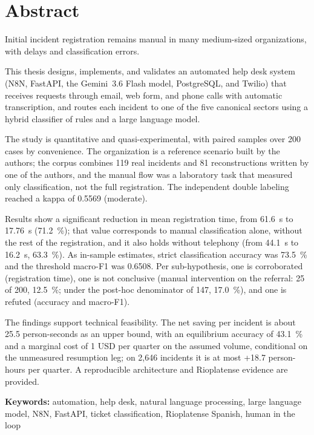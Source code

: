 \newpage
\section*{Abstract}

Initial incident registration remains manual in many medium-sized organizations, with delays and classification errors.

This thesis designs, implements, and validates an automated help desk system (N8N, FastAPI, the Gemini~3.6 Flash model, PostgreSQL, and Twilio) that receives requests through email, web form, and phone calls with automatic transcription, and routes each incident to one of the five canonical sectors using a hybrid classifier of rules and a large language model.

The study is quantitative and quasi-experimental, with paired samples over 200 cases by convenience. The organization is a reference scenario built by the authors; the corpus combines 119 real incidents and 81 reconstructions written by one of the authors, and the manual flow was a laboratory task that measured only classification, not the full registration. The independent double labeling reached a kappa of 0.5569 (moderate).

Results show a significant reduction in mean registration time, from 61.6~s to 17.76~s (71.2~\%); that value corresponds to manual classification alone, without the rest of the registration, and it also holds without telephony (from 44.1~s to 16.2~s, 63.3~\%). As in-sample estimates, strict classification accuracy was 73.5~\% and the threshold macro-F1 was 0.6508. Per sub-hypothesis, one is corroborated (registration time), one is not conclusive (manual intervention on the referral: 25 of 200, 12.5~\%; under the post-hoc denominator of 147, 17.0~\%), and one is refuted (accuracy and macro-F1).

The findings support technical feasibility. The net saving per incident is about 25.5 person-seconds as an upper bound, with an equilibrium accuracy of 43.1~\% and a marginal cost of 1 USD per quarter on the assumed volume, conditional on the unmeasured resumption leg; on 2,646 incidents it is at most +18.7 person-hours per quarter. A reproducible architecture and Rioplatense evidence are provided.

\bigskip
\noindent\textbf{Keywords:} automation, help desk, natural language processing, large language model, N8N, FastAPI, ticket classification, Rioplatense Spanish, human in the loop

\newpage